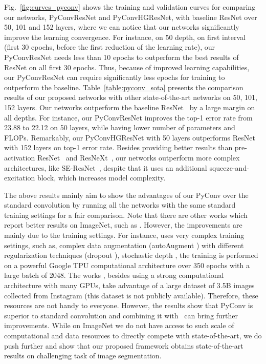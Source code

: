 \documentclass{article}
\begin{document}
Fig.~\ref{fig:curves_pyconv} shows  the training and validation curves for comparing our networks, PyConvResNet and PyConvHGResNet,  with baseline ResNet over 50, 101 and 152 layers, where we can notice that our networks significantly improve the learning convergence.  For instance, on 50 depth, on first interval (first 30 epochs, before the first reduction of the learning rate), our PyConvResNet needs less than 10 epochs to outperform the best results of ResNet on all first 30 epochs. Thus, because of improved learning capabilities, our PyConvResNet can require significantly less epochs for training to outperform the baseline.
Table~\ref{table:pyconv_sota} presents the comparison results of our proposed networks with other state-of-the-art networks on 50, 101, 152 layers. Our networks outperform the baseline ResNet~\cite{he2016deep} by a large margin on all depths. For instance, our PyConvResNet improves the top-1 error rate from 23.88 to 22.12 on 50 layers, while having lower number of parameters and FLOPs. Remarkably, our PyConvHGResNet with 50 layers outperforms ResNet with 152 layers on top-1 error rate.  Besides providing better results than pre-activation ResNet~\cite{he2016identity}  and ResNeXt~\cite{xie2017aggregated}, our networks outperform more complex architectures, like SE-ResNet~\cite{hu2018squeeze}, despite that it uses an additional squeeze-and-excitation block, which increases model complexity.

The above results mainly aim to show the advantages of our PyConv over the standard convolution by running all the networks with the same standard training settings for a fair comparison. Note that there are other works which report better results on ImageNet, such as \cite{mahajan2018exploring,tan2019efficientnet,touvron2019fixing}. However, the improvements are mainly due to the training settings. For instance, \cite{tan2019efficientnet}  uses very complex training settings, such as, complex data augmentation (autoAugment \cite{cubuk2019autoaugment}) with different regularization techniques (dropout \cite{srivastava2014dropout}), stochastic depth \cite{huang2016deep}, the training is performed on a powerful Google TPU computational architecture over 350 epochs with a large batch of 2048. The works \cite{mahajan2018exploring,touvron2019fixing}, besides using  a strong computational architecture with many GPUs, take advantage of a large dataset of 3.5B images collected from Instagram (this dataset is not publicly available). Therefore, these resources are not handy to everyone. However, the  results show that PyConv is superior to standard convolution and combining it with~\cite{mahajan2018exploring,tan2019efficientnet,touvron2019fixing} can bring further improvements.  While on ImageNet we do not have access to such scale of computational and data resources to  directly compete with state-of-the-art, we do push further and show that our proposed framework obtains state-of-the-art results on challenging task of image segmentation.
\end{document}
